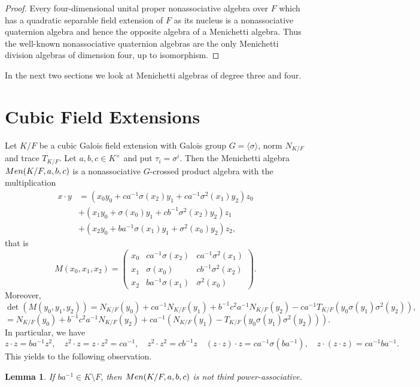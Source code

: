 \documentclass[11pt]{amsart}
\theoremstyle{plain}
\newtheorem{lemma}[theorem]{Lemma}
\theoremstyle{definition}
\begin{document}
\begin{proof}
Every four-dimensional unital proper nonassociative  algebra over  $F$ which has a quadratic separable field extension of $F$ as its nucleus is a nonassociative quaternion algebra \cite{W} and hence the opposite algebra of a Menichetti algebra. Thus the well-known nonassociative quaternion algebras are the only Menichetti division algebras of dimension four, up to isomorphism.
\end{proof}

In the next two sections we look at Menichetti algebras of degree three and four.



\section{Cubic Field Extensions} \label{sec:three}


Let $K/F$ be a cubic Galois field extension with Galois group $G=\langle \sigma \rangle$, norm $N_{K/F}$ and trace $T_{K/F}$. Let $a,b,c \in K^\times$ and put $\tau_i=\sigma^i$.
Then the Menichetti algebra ${\rm Men}(K/F, a,b,c) $ is a nonassociative $G$-crossed product algebra with the multiplication
\begin{align*}
x\cdot y &= (x_0y_0 +ca^{-1}\sigma(x_2) y_1  + ca^{-1}\sigma^2(x_1) y_2)z_0\\
&+ (x_1y_0 + \sigma(x_0) y_1  + cb^{-1} \sigma^2(x_2) y_2)z_1  \\
&+ (x_2y_0 + ba^{-1}\sigma(x_1) y_1 +\sigma^2(x_0)y_2 )z_2,
\end{align*}
 that is
$$
M(x_0, x_1, x_2)=
\left( \begin{array}{ccc}
x_0 &  ca^{-1}\sigma(x_2) &   ca^{-1}\sigma^2(x_1) \\
x_1     & \sigma(x_0) &   cb^{-1}\sigma^2(x_2)  \\
x_2    & ba^{-1}\sigma(x_1)& \sigma^2(x_0)
\end{array} \right).
$$
Moreover,
\[\det (M(y_0, y_1, y_2))= N_{K/F}(y_0) + ca^{-1}N_{K/F}(y_1) + b^{-1}c^2 a^{-1}N_{K/F}(y_2) - ca^{-1}T_{K/F}(y_0\sigma(y_1)\sigma^2(y_2)),\]
\[  =N_{K/F}(y_0) + b^{-1}c^2 a^{-1}N_{K/F}(y_2)+ ca^{-1}(N_{K/F}(y_1)-T_{K/F}(y_0\sigma(y_1)\sigma^2(y_2))) .\]
In particular, we have
\[z\cdot z = ba^{-1}z^2, \quad
 z^2\cdot z = z \cdot z^2 = ca^{-1},  \quad
 z^2 \cdot z^2 = cb^{-1}z  \quad
(z\cdot z)\cdot z =  ca^{-1}\sigma(ba^{-1}),  \quad
z\cdot (z\cdot z) =   ca^{-1}ba^{-1}.\]
This yields to the following observation.

\begin{lemma}
 If $ba^{-1}\in K\setminus F$, then ${\rm Men}(K/F,a,b,c)$ is not third power-associative.
\end{lemma}
\end{document}
